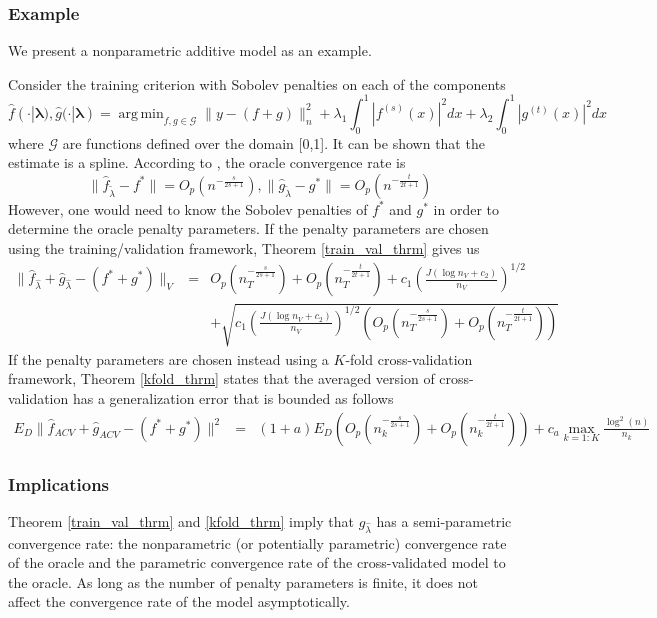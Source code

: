 \documentclass[12pt]{article}
\DeclareMathOperator*{\argmin}{arg\,min}
\begin{document}
\subsubsection{Example}

We present a nonparametric additive model as an example.

Consider the training criterion with Sobolev penalties on each of the components
\begin{equation}
\hat{f}(\cdot | {\boldsymbol \lambda}), \hat{g}(\cdot | {\boldsymbol \lambda}) =
\argmin_{f,g \in \mathcal{G}}
\| y - (f + g) \|_n^2 +
\lambda_1 \int_0^1 |f^{(s)}(x)|^2 dx +
\lambda_2 \int_0^1 |g^{(t)}(x)|^2 dx
\end{equation}
where $\mathcal{G}$ are functions defined over the domain [0,1].
It can be shown that the estimate is a spline. According to \citet{van2014additive}, the oracle convergence rate is
\begin{equation}
\| \hat{f}_{\tilde \lambda} - f^* \| = O_p(n^{-\frac{s}{2s+1}}), \| \hat{g}_{\tilde \lambda} - g^* \| = O_p(n^{-\frac{t}{2t+1}})
\end{equation}
However, one would need to know the Sobolev penalties of $f^*$ and $g^*$ in order
to determine the oracle penalty parameters.
If the penalty parameters are chosen using the training/validation framework, Theorem \ref{train_val_thrm} gives us
\begin{eqnarray*}
\| \hat{f}_{\hat \lambda} + \hat{g}_{\hat \lambda} - (f^* + g^*) \|_V &=&
O_p(n_T^{-\frac{s}{2s+1}}) + O_p(n_T^{-\frac{t}{2t+1}})
+c_{1} \left (\frac{J(\log n_{V}+c_{2})}{n_{V}} \right )^{1/2} \\
&& +\sqrt{ c_{1} \left (\frac{J(\log n_{V}+c_{2})}{n_{V}} \right )^{1/2}  \left (O_p(n_T^{-\frac{s}{2s+1}}) + O_p(n_T^{-\frac{t}{2t+1}}) \right) }
\end{eqnarray*}
If the penalty parameters are chosen instead using a $K$-fold cross-validation framework, Theorem \ref{kfold_thrm} states that the
averaged version of cross-validation has a generalization error that is bounded as follows
\begin{eqnarray*}
E_D \| \hat{f}_{ACV} + \hat{g}_{ACV} - (f^* + g^*) \|^2 &=&
(1+a) E_D  \left (O_p(n_k^{-\frac{s}{2s+1}}) + O_p(n_k^{-\frac{t}{2t+1}})  \right )
+ c_a \max_{k=1:K} \frac{\log^2(n)}{n_k}
\end{eqnarray*}

\subsubsection{Implications}
Theorem \ref{train_val_thrm} and \ref{kfold_thrm} imply that $\hat{g}_{\hat{\lambda}}$ has a semi-parametric convergence rate: the nonparametric (or potentially parametric) convergence rate of the oracle and the parametric convergence rate of the cross-validated model to the oracle. As long as the number of penalty parameters is finite, it does not affect the convergence rate of the model asymptotically.
\end{document}
